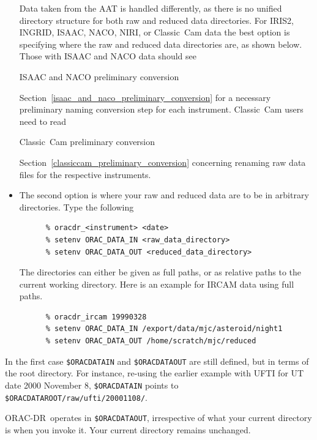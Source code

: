 \documentclass[twoside,11pt]{article}
\newcommand{\htmlref}[2]{#1}
\newenvironment{latexonly}{}{}
\renewcommand{\_}{\texttt{\symbol{95}}}
\newcommand{\ORACDR}{{\footnotesize ORAC-DR}}
\begin{document}
\begin{itemize}
Data taken from the AAT is handled differently, as there is no unified
directory structure for both raw and reduced data directories.  For
IRIS2, INGRID, ISAAC, NACO, NIRI, or Classic~Cam data the best option is
specifying where the raw and reduced data directories are, as shown
below.  Those with ISAAC and NACO data should see
\begin{htmlonly}
\htmlref{ISAAC and NACO preliminary conversion}{isaac_preliminary_conversion}
\end{htmlonly}
\begin{latexonly}
Section~\ref{isaac_and_naco_preliminary_conversion}
\end{latexonly}
for a necessary preliminary naming conversion step for each instrument.
Classic~Cam users need to read 
\begin{htmlonly}
\htmlref{Classic~Cam preliminary conversion}{classiccam_preliminary_conversion}
\end{htmlonly}
\begin{latexonly}
Section~\ref{classiccam_preliminary_conversion}
\end{latexonly}
concerning renaming raw data files for the respective instruments.

\item The second option is where your raw and reduced data are to be
in arbitrary directories.  Type the following

\begin{verbatim}
      % oracdr_<instrument> <date>
      % setenv ORAC_DATA_IN <raw_data_directory>
      % setenv ORAC_DATA_OUT <reduced_data_directory>
\end{verbatim}

The directories can either be given as full paths, or as relative paths
to the current working directory.  Here is an example for IRCAM data using
full paths.
\begin{verbatim}
      % oracdr_ircam 19990328
      % setenv ORAC_DATA_IN /export/data/mjc/asteroid/night1
      % setenv ORAC_DATA_OUT /home/scratch/mjc/reduced
\end{verbatim}

\end{itemize}
In the first case {\tt \$ORAC\_DATA\_IN} and {\tt \$ORAC\_DATA\_OUT} are
still defined, but in terms of the root directory.  For instance, re-using
the earlier example with UFTI for UT date 2000 November 8,
{\tt \$ORAC\_DATA\_IN} points to {\tt \$ORAC\_DATA\_ROOT/raw/ufti/20001108/}.

\ORACDR\ operates in {\tt \$ORAC\_DATA\_OUT}, irrespective of
what your current directory is when you invoke it.   Your current
directory remains unchanged.  
\end{document}
